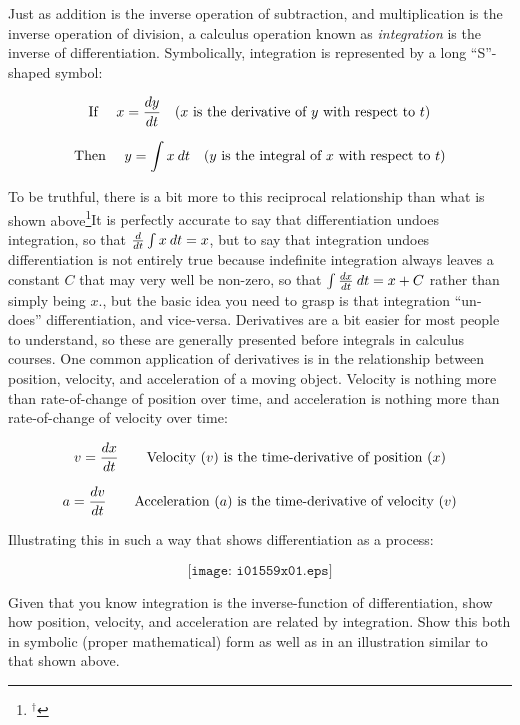 

Just as addition is the inverse operation of subtraction, and multiplication is the inverse operation of division, a calculus operation known as {\it integration} is the inverse of differentiation.  Symbolically, integration is represented by a long ``S''-shaped symbol:

$$\hbox{If \hskip 10pt} x = {dy \over dt} \hbox{\hskip 10pt (} x \hbox{ is the derivative of }y\hbox{ with respect to }t\hbox{)}$$

$$\hbox{Then \hskip 10pt} y = \int x \> dt \hbox{\hskip 10pt (} y \hbox{ is the integral of }x\hbox{ with respect to }t\hbox{)}$$

To be truthful, there is a bit more to this reciprocal relationship than what is shown above\footnote{$^{\dag}$}{It is perfectly accurate to say that differentiation undoes integration, so that ${d \over dt} \int x \> dt = x$, but to say that integration undoes differentiation is not entirely true because indefinite integration always leaves a constant $C$ that may very well be non-zero, so that $\int {dx \over dt} \> dt = x + C$ rather than simply being $x$.}, but the basic idea you need to grasp is that integration ``un-does'' differentiation, and vice-versa.  Derivatives are a bit easier for most people to understand, so these are generally presented before integrals in calculus courses.  One common application of derivatives is in the relationship between position, velocity, and acceleration of a moving object.  Velocity is nothing more than rate-of-change of position over time, and acceleration is nothing more than rate-of-change of velocity over time:

$$v = {dx \over dt} \hbox{\hskip 20pt Velocity (}v \hbox{) is the time-derivative of position (}x \hbox{)}$$

$$a = {dv \over dt} \hbox{\hskip 20pt Acceleration (}a \hbox{) is the time-derivative of velocity (}v \hbox{)}$$

Illustrating this in such a way that shows differentiation as a process:

$$\texttt{[image: i01559x01.eps]}$$

Given that you know integration is the inverse-function of differentiation, show how position, velocity, and acceleration are related by integration.  Show this both in symbolic (proper mathematical) form as well as in an illustration similar to that shown above.

